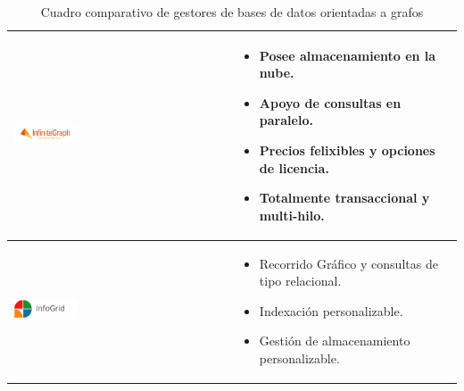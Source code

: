 \begin{table}[b!]
\begin{tabular}{|p{2cm}|ll}
        \hline
          \multicolumn{1}{|p{5cm}|}{\includegraphics[width=0.3\textwidth]{images/InfiniteGraph}} & 
          \multicolumn{1}{p{10cm}|}{
          \begin{itemize}
          \vspace{-7mm}
        \item Posee almacenamiento en la nube.
        \item Apoyo de consultas en paralelo.
        \item Precios felixibles y opciones de licencia.
        \item Totalmente transaccional y multi-hilo.
        \cite{32}
      \end{itemize}} \\ 
        \hline
          \multicolumn{1}{|p{3cm}|}{\includegraphics[width=0.3\textwidth]{images/InfoGrid}} & 
          \multicolumn{1}{p{10cm}|}{
          \begin{itemize}
          \vspace{-10mm}
        \item Recorrido Gráfico y consultas de tipo relacional.
        \item Indexación personalizable.
        \item Gestión de almacenamiento personalizable.\cite{33}
      \end{itemize}}\\ 
         \hline
      \end{tabular}
      \caption{Cuadro comparativo de gestores de bases de datos orientadas a grafos}
      \label{table:bd orientadas a grafos}
    \end{table}
\newpage
